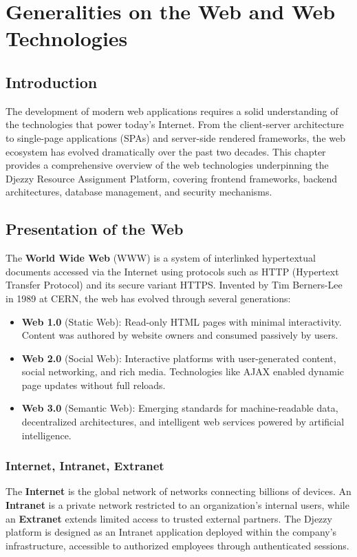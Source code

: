 \documentclass{bts-report}
\begin{document}
\chapter{Generalities on the Web and Web Technologies}

\section*{Introduction}
The development of modern web applications requires a solid understanding of the technologies that power today's Internet. From the client-server architecture to single-page applications (SPAs) and server-side rendered frameworks, the web ecosystem has evolved dramatically over the past two decades. This chapter provides a comprehensive overview of the web technologies underpinning the Djezzy Resource Assignment Platform, covering frontend frameworks, backend architectures, database management, and security mechanisms.

\section{Presentation of the Web}

The \textbf{World Wide Web} (WWW) is a system of interlinked hypertextual documents accessed via the Internet using protocols such as HTTP (Hypertext Transfer Protocol) and its secure variant HTTPS. Invented by Tim Berners-Lee in 1989 at CERN, the web has evolved through several generations:

\begin{itemize}
  \item \textbf{Web 1.0} (Static Web): Read-only HTML pages with minimal interactivity. Content was authored by website owners and consumed passively by users.
  \item \textbf{Web 2.0} (Social Web): Interactive platforms with user-generated content, social networking, and rich media. Technologies like AJAX enabled dynamic page updates without full reloads.
  \item \textbf{Web 3.0} (Semantic Web): Emerging standards for machine-readable data, decentralized architectures, and intelligent web services powered by artificial intelligence.
\end{itemize}

\subsection{Internet, Intranet, Extranet}
The \textbf{Internet} is the global network of networks connecting billions of devices. An \textbf{Intranet} is a private network restricted to an organization's internal users, while an \textbf{Extranet} extends limited access to trusted external partners. The Djezzy platform is designed as an Intranet application deployed within the company's infrastructure, accessible to authorized employees through authenticated sessions.
\end{document}
